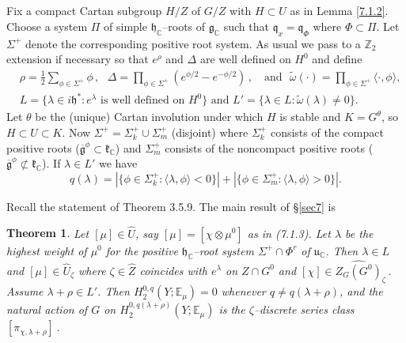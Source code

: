 \documentclass{conm-p-l}
\newtheorem{theorem}[equation]{Theorem}
\renewcommand{\gg}{\mathfrak{g}}
\newcommand{\gq}{\mathfrak{q}}
\def\gg{\mathfrak{g}}
\def\gh{\mathfrak{h}}
\def\gk{\mathfrak{k}}
\def\gq{\mathfrak{q}}
\def\gu{\mathfrak{u}}
\def\C{\mathbb{C}}
\def\E{\mathbb{E}}
\def\Z{\mathbb{Z}}
\begin{document}
\subsection{}\label{ssec7b}\setcounter{equation}{0}
Fix a compact Cartan subgroup $H/Z$ of $G/Z$ with $H \subset U$ as in 
Lemma \ref{7.1.2}.  Choose a system $\Pi$ of simple
$\gh_\C$--roots of $\gg_\C$ such that $\gq_x = \gq_\Phi$ where $\Phi \subset 
\Pi$.  Let $\Sigma^+$ denote the corresponding positive root system.  As usual
we pass to a $\Z_2$ extension if necessary so that $e^\rho$ and $\Delta$ are
well defined on $H^0$ and define
\begin{equation}\label{7.2.1} 
\begin{aligned}
&\rho = \frac{1}{2}\sum_{\phi \in \Sigma^+} \phi\,,\,\,\,\,
	\Delta = \prod_{\phi \in \Sigma^+} 
	(e^{\phi/2} - e^{-\phi/2})\,,\,\,\,\, \text{ and }\,\,
	\widetilde{\omega}(\cdot) = \prod_{\phi \in \Sigma^+}
	\langle \cdot, \phi\rangle, \\
&L = \{\lambda \in i\gh^* : e^\lambda \text{ is
	well defined on }
	H^0\} \text{ and } L' = \{\lambda \in L : \widetilde{\omega}(\lambda)
	\ne 0\}. 
\end{aligned}
\end{equation}
Let $\theta$ be the (unique) Cartan involution under which $H$ is
stable and $K = G^\theta$, so $H \subset U \subset K$.
Now $\Sigma^+ = \Sigma_k^+ \cup \Sigma_m^+$ (disjoint) where $\Sigma_k^+$
consists of the compact positive roots ($\overline{\gg}^\phi \subset \gk_\C$)
and $\Sigma_m^+$ consists of the noncompact positive roots
($\overline{\gg}^\phi \not\subset \gk_\C$).  If $\lambda \in L'$ we have
\begin{equation}\label{7.2.2}
q(\lambda) = |\{\phi \in \Sigma^+_k : \langle \lambda,
	\phi \rangle < 0\}| + |\{\phi \in \Sigma^+_m : \langle \lambda,
        \phi \rangle > 0\}|.
\end{equation}

Recall the statement of Theorem 3.5.9.  The main result of \S \ref{sec7} is

\begin{theorem}\label{7.2.3}  Let $[\mu] \in \widehat{U}$,
say $[\mu] = [\chi \otimes \mu^0]$ as in {\rm (7.1.3)}.  Let $\lambda$
be the highest weight of $\mu^0$ for the positive $\gh_\C$--root system
$\Sigma^+ \cap \Phi^r$ of $\gu_\C$.  Then $\lambda \in L$ and
$[\mu] \in \widehat{U}_\zeta$ where $\zeta \in \widehat{Z}$ coincides with
$e^\lambda$ on $Z \cap G^0$ and $[\chi] \in \widehat{Z_G(G^0)}_\zeta$\,.
Assume $\lambda + \rho \in L'$.  Then
$H^{0,q}_2(Y;\E_\mu) = 0$ whenever $q \ne q(\lambda + \rho)$, and
the natural action of $G$ on
$H^{0,q(\lambda + \rho)}_2(Y;\E_\mu)$ is the $\zeta$--discrete series
class $[\pi_{\chi,\lambda + \rho}]$\,.
\end{theorem}
\end{document}
